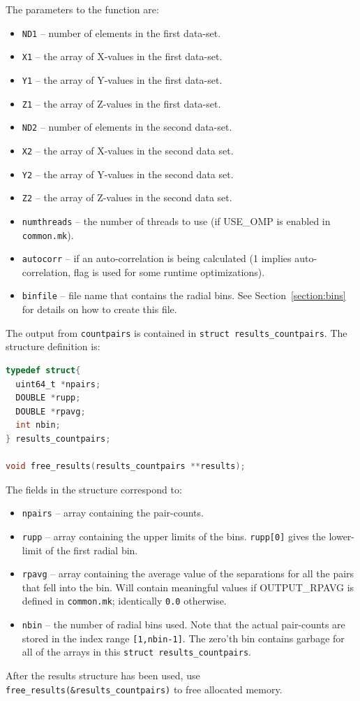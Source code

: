 \documentclass[12pt,titlepage,justified]{article}
\newcommand{\xir}{\ensuremath{{\xi(r)}}\xspace}
\begin{document}
The parameters to the function are:
\begin{itemize}
\item \texttt{ND1} -- number of elements in the first data-set.
\item \texttt{X1}  -- the array of X-values in the first data-set.
\item \texttt{Y1}  -- the array of Y-values in the first data-set.
\item \texttt{Z1}  -- the array of Z-values in the first data-set.
\item \texttt{ND2} -- number of elements in the second data-set.
\item \texttt{X2}  -- the array of X-values in the second data set.
\item \texttt{Y2}  -- the array of Y-values in the second data set.
\item \texttt{Z2}  -- the array of Z-values in the second data set.
\item \texttt{numthreads} -- the number of threads to use (if USE\_OMP is enabled in \texttt{common.mk}).
\item \texttt{autocorr} -- if an auto-correlation is being calculated (1 implies auto-correlation, flag is used for some runtime optimizations).
\item \texttt{binfile} -- file name that contains the radial bins. See Section~\ref{section:bins} for details on how to create this file.
\end{itemize}

The output from \texttt{countpairs} is contained in \texttt{struct results\_countpairs}. The structure
definition is:
\begin{lstlisting}[language=C,numbers=none,label={code:API_DD_struct},basicstyle=\scriptsize,caption={Structure definition for the output of \xir}]
typedef struct{
  uint64_t *npairs;
  DOUBLE *rupp;
  DOUBLE *rpavg;
  int nbin;
} results_countpairs;

void free_results(results_countpairs **results);
\end{lstlisting}

The fields in the structure correspond to:
\begin{itemize}
\item \texttt{npairs} -- array containing the pair-counts. 
\item \texttt{rupp}   -- array containing the upper limits of the bins. \texttt{rupp[0]} gives the lower-limit of the first radial bin. 
\item \texttt{rpavg}  -- array containing the average value of the separations for all the pairs that fell into the bin. Will contain 
meaningful values if OUTPUT\_RPAVG is defined in \texttt{common.mk}; identically \texttt{0.0} otherwise. 
\item \texttt{nbin}   -- the number of radial bins used. Note that the actual pair-counts are stored in the index range \texttt{[1,nbin-1]}. The
zero'th bin contains garbage for all of the arrays in this \texttt{struct results\_countpairs}.
\end{itemize}
After the results structure has been used, use \texttt{free\_results(\&results\_countpairs)} to free allocated memory. 
\end{document}
